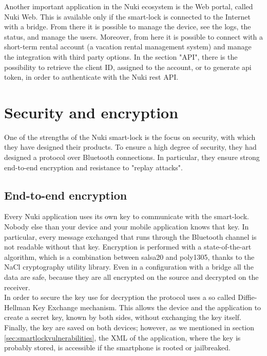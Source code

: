 Another important application in the Nuki ecosystem is the Web portal, called Nuki Web. This is available only if the smart-lock is connected to the Internet with a bridge. From there it is possible to manage the device, see the logs, the status, and manage the users. Moreover, from here it is possible to connect with a short-term rental account (a vacation rental management system) and manage the integration with third party options. In the section "API", there is the possibility to retrieve the client ID, assigned to the account, or to generate \acrshort{api} token, in order to authenticate with the Nuki \acrshort{rest} API.

\section{Security and encryption}
\label{sec:nuki-sec}
One of the strengths of the Nuki smart-lock is the focus on security, with which they have designed their products. To ensure a high degree of security, they had designed a protocol over Bluetooth connections. In particular, they ensure strong end-to-end encryption and resistance to "replay attacks"\cite{encryption_2015}.
\subsection{End-to-end encryption}
Every Nuki application uses its own key to communicate with the smart-lock. Nobody else than your device and your mobile application knows that key. In particular, every message exchanged that runs through the Bluetooth channel is not readable without that key. Encryption is performed with a state-of-the-art algorithm, which is a combination between salsa20\cite{bernstein2005salsa20} and poly1305\cite{procter2014security}, thanks to the NaCl cryptography utility library.
Even in a configuration with a bridge all the data are safe, because they are all encrypted on the source and decrypted on the receiver.
\\ In order to secure the key use for decryption the protocol uses a so called Diffie-Hellman Key Exchange mechanism. This allows the device and the application to create a secret key, known by both sides, without exchanging the key itself.
\\ Finally, the key are saved on both devices; however, as we mentioned in section \ref{sec:smartlockvulnerabilities}, the XML of the application, where the key is probably stored, is accessible if the smartphone is rooted or jailbreaked. 

